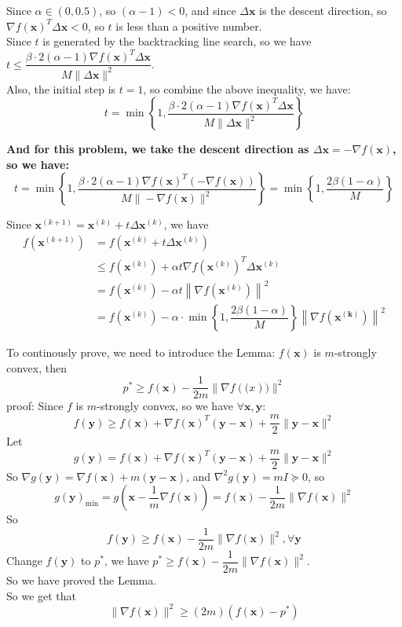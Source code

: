 Since $\alpha\in(0,0.5)$, so $(\alpha-1)<0$, and since $\Delta \mathbf{x}$ is the descent direction, so $\nabla f(\mathbf{x})^T\Delta \mathbf{x}<0$, so $t$ is less than a positive number.\\
Since $t$ is generated by the backtracking line search, so we have $t\leq \dfrac{\beta\cdot 2(\alpha-1)\nabla f(\mathbf{x})^T\Delta \mathbf{x}}{M\|\Delta \mathbf{x}\|^2}$.\\
Also, the initial step is $t=1$, so combine the above inequality, we have:
$$t=\min\left\{1,\dfrac{\beta\cdot 2(\alpha-1)\nabla f(\mathbf{x})^T\Delta \mathbf{x}}{M\|\Delta \mathbf{x}\|^2}\right\}$$

\textbf{And for this problem, we take the descent direction as $\Delta \mathbf{x}=-\nabla f(\mathbf{x})$, so we have:}
$$t=\min\left\{1,\dfrac{\beta\cdot 2(\alpha-1)\nabla f(\mathbf{x})^T(-\nabla f(\mathbf{x}))}{M\|-\nabla f(\mathbf{x})\|^2}\right\}=\min\left\{1,\dfrac{2\beta(1-\alpha)}{M}\right\}$$

Since $\mathbf{x}^{(k+1)}=\mathbf{x}^{(k)}+t\Delta\mathbf{x}^{(k)}$, we have 
\begin{align*}
    f\left(\mathbf{x}^{(k+1)}\right) &= f\left(\mathbf{x}^{(k)}+t\Delta\mathbf{x}^{(k)}\right) \\
    &\leq f\left(\mathbf{x}^{(k)}\right)+\alpha t\nabla f\left(\mathbf{x}^{(k)}\right)^T\Delta \mathbf{x}^{(k)} \\
    &= f\left(\mathbf{x}^{(k)}\right) - \alpha t\left\|\nabla f\left(\mathbf{x}^{(k)}\right)\right\|^2 \\
    &= f\left(\mathbf{x}^{(k)}\right) - \alpha\cdot\min\left\{1,\dfrac{2\beta(1-\alpha)}{M}\right\} \left\|\nabla f\left(\mathbf{x^{(k)}}\right)\right\|^2
\end{align*}

To continously prove, we need to introduce the Lemma:
$f(\mathbf{x})$ is $m$-strongly convex, then $$p^*\geq f(\mathbf{x})-\dfrac{1}{2m}\|\nabla f(\mathbf(x))\|^2$$
proof:
Since $f$ is $m$-strongly convex, so we have $\forall \mathbf{x}, \mathbf{y}$:
$$f(\mathbf{y})\geq f(\mathbf{x})+\nabla f(\mathbf{x})^T(\mathbf{y}-\mathbf{x})+\dfrac{m}{2}\|\mathbf{y}-\mathbf{x}\|^2$$
Let $$g(\mathbf{y})= f(\mathbf{x})+\nabla f(\mathbf{x})^T(\mathbf{y}-\mathbf{x})+\dfrac{m}{2}\|\mathbf{y}-\mathbf{x}\|^2$$
So $\nabla g(\mathbf{y})=\nabla f(\mathbf{x}) + m(\mathbf{y}-\mathbf{x})$, and $\nabla^2g(\mathbf{y})=mI\succeq 0$, so 
$$g(\mathbf{y})_{\min}=g\left(\mathbf{x}-\dfrac{1}{m}\nabla f(\mathbf{x})\right)=f(\mathbf{x})-\dfrac{1}{2m}\|\nabla f(\mathbf{x})\|^2$$
So 
$$f(\mathbf{y})\geq f(\mathbf{x})-\dfrac{1}{2m}\|\nabla f(\mathbf{x})\|^2, \forall\mathbf{y}$$
Change $f(\mathbf{y})$ to $p^*$, we have $p^*\geq f(\mathbf{x})-\dfrac{1}{2m}\|\nabla f(\mathbf{x})\|^2$.\\
So we have proved the Lemma.\\
So we get that
$$\|\nabla f(\mathbf{x})\|^2\geq (2m)\left(f(\mathbf{x})-p^*\right)$$

